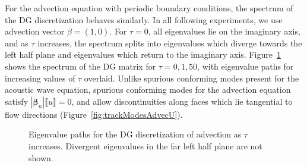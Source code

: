 \documentclass[preprint,10pt]{elsarticle}
\newcommand{\LRb}[1]{\left| #1 \right|}
\newcommand{\jump}[1] {\ensuremath{\llbracket#1\rrbracket}}
\newcommand{\note}[1]{#1}
\begin{document}

For the advection equation with periodic boundary conditions, the \note{spectrum} of the DG discretization behaves similarly.  In all following experiments, we use advection vector $\beta = (1,0)$.  For $\tau=0$, all eigenvalues lie on the imaginary axis, and as $\tau$ increases, the \note{spectrum} splits into eigenvalues which diverge towards the left half plane and eigenvalues which return to the imaginary axis.  Figure~\ref{fig:trackModesAdvec} shows the \note{spectrum} of the DG matrix for $\tau = 0,1,50$, with eigenvalue paths for increasing values of $\tau$ overlaid.  Unlike spurious conforming modes present for the acoustic wave equation, spurious conforming modes for the advection equation satisfy $\LRb{\bm{\beta}_n}\jump{ u} = 0$, and allow discontinuities along faces which lie tangential to flow directions (Figure~\ref{fig:trackModesAdvecU}).  


\begin{figure}
\centering
{}
\hspace{.5em}
\caption{Eigenvalue paths for the DG discretization of advection as $\tau$ increases.  Divergent eigenvalues in the far left half plane are not shown.  }
\label{fig:trackModesAdvec}
\end{figure}
\end{document}

